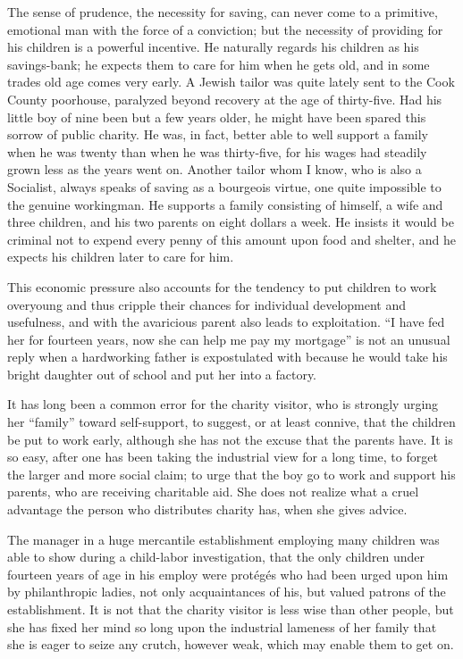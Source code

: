 \documentclass[]{article}
\begin{document}
\begin{sectionbody}
\addamsparagraph The sense of prudence, the necessity for saving, can never come to a
primitive, emotional man with the force of a conviction; but the
necessity of providing for his children is a powerful incentive. He
naturally regards his children as his savings-bank; he expects them to
care for him when he gets old, and in some trades old age comes very
early. A Jewish tailor was quite lately sent to the Cook County
poorhouse, paralyzed beyond recovery at the age of thirty-five. Had his
little boy of nine been but a few years older, he might have been spared
this sorrow of public charity. He was, in fact, better able to well
support a family when he was twenty than when he was thirty-five, for
his wages had steadily grown less as the years went on. Another tailor
whom I know, who is also a Socialist, always speaks of saving as a
bourgeois virtue, one quite impossible to the genuine workingman. He
supports a family consisting of himself, a wife and three children, and
his two parents on eight dollars a week. He insists it would be criminal
not to expend every penny of this amount upon food and shelter, and he
expects his children later to care for him.

\addamsparagraph This economic pressure also accounts for the tendency to put children to
work overyoung and thus cripple their chances for individual
development and usefulness, and with the avaricious parent also leads to
exploitation. ``I have fed her for fourteen years, now she can help me
pay my mortgage'' is not an unusual reply when a hardworking father is
expostulated with because he would take his bright daughter out of
school and put her into a factory.

\addamsparagraph It has long been a common error for the charity visitor, who is strongly
urging her ``family'' toward self-support, to suggest, or at least
connive, that the children be put to work early, although she has not
the excuse that the parents have. It is so easy, after one has been
taking the industrial view for a long time, to forget the larger and
more social claim; to urge that the boy go to work and support his
parents, who are receiving charitable aid. She does not realize what a
cruel advantage the person who distributes charity has, when she gives
advice.

\addamsparagraph The manager in a huge mercantile establishment employing many children
was able to show during a child-labor investigation, that the only
children under fourteen years of age in his employ were protégés who had
been urged upon him by philanthropic ladies, not only acquaintances of
his, but valued patrons of the establishment. It is not that the charity
visitor is less wise than other people, but she has fixed her mind so
long upon the industrial lameness of her family that she is eager to
seize any crutch, however weak, which may enable them to get on.


\end{sectionbody}
\end{document}
